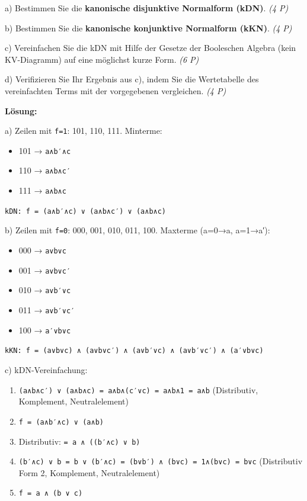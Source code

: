 \documentclass[11pt, a4paper]{article}
\begin{document}
a) Bestimmen Sie die \textbf{kanonische disjunktive Normalform (kDN)}. \textit{(4 P)}


b) Bestimmen Sie die \textbf{kanonische konjunktive Normalform (kKN)}. \textit{(4 P)}


c) Vereinfachen Sie die kDN mit Hilfe der Gesetze der Booleschen Algebra (kein KV-Diagramm) auf eine möglichst kurze Form. \textit{(6 P)}


d) Verifizieren Sie Ihr Ergebnis aus c), indem Sie die Wertetabelle des vereinfachten Terms mit der vorgegebenen vergleichen. \textit{(4 P)}


\textbf{Lösung:}


a) Zeilen mit \texttt{f=1}: 101, 110, 111. Minterme:

\begin{itemize}
  \item 101 → \texttt{a∧b′∧c}
  \item 110 → \texttt{a∧b∧c′}
  \item 111 → \texttt{a∧b∧c}
\end{itemize}

\texttt{kDN: f = (a∧b′∧c) ∨ (a∧b∧c′) ∨ (a∧b∧c)}


b) Zeilen mit \texttt{f=0}: 000, 001, 010, 011, 100. Maxterme (a=0→a, a=1→a′):

\begin{itemize}
  \item 000 → \texttt{a∨b∨c}
  \item 001 → \texttt{a∨b∨c′}
  \item 010 → \texttt{a∨b′∨c}
  \item 011 → \texttt{a∨b′∨c′}
  \item 100 → \texttt{a′∨b∨c}
\end{itemize}

\texttt{kKN: f = (a∨b∨c) ∧ (a∨b∨c′) ∧ (a∨b′∨c) ∧ (a∨b′∨c′) ∧ (a′∨b∨c)}


c) kDN-Vereinfachung:

\begin{enumerate}
  \item \texttt{(a∧b∧c′) ∨ (a∧b∧c) = a∧b∧(c′∨c) = a∧b∧1 = a∧b} (Distributiv, Komplement, Neutralelement)
  \item \texttt{f = (a∧b′∧c) ∨ (a∧b)}
  \item Distributiv: \texttt{= a ∧ ((b′∧c) ∨ b)}
  \item \texttt{(b′∧c) ∨ b = b ∨ (b′∧c) = (b∨b′) ∧ (b∨c) = 1∧(b∨c) = b∨c} (Distributiv Form 2, Komplement, Neutralelement)
  \item \texttt{f = a ∧ (b ∨ c)}
\end{enumerate}
\end{document}
